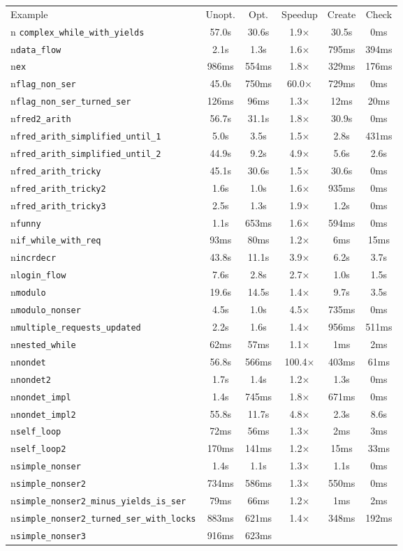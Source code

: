 \begin{tabular}{lccccc}
\toprule
Example & Unopt. & Opt. & Speedup & Create & Check \\n\midrule
\texttt{complex\_while\_with\_yields} & 57.0s & 30.6s & 1.9× & 30.5s & 0ms \\n\texttt{data\_flow} & 2.1s & 1.3s & 1.6× & 795ms & 394ms \\n\texttt{ex} & 986ms & 554ms & 1.8× & 329ms & 176ms \\n\texttt{flag\_non\_ser} & 45.0s & 750ms & 60.0× & 729ms & 0ms \\n\texttt{flag\_non\_ser\_turned\_ser} & 126ms & 96ms & 1.3× & 12ms & 20ms \\n\texttt{fred2\_arith} & 56.7s & 31.1s & 1.8× & 30.9s & 0ms \\n\texttt{fred\_arith\_simplified\_until\_1} & 5.0s & 3.5s & 1.5× & 2.8s & 431ms \\n\texttt{fred\_arith\_simplified\_until\_2} & 44.9s & 9.2s & 4.9× & 5.6s & 2.6s \\n\texttt{fred\_arith\_tricky} & 45.1s & 30.6s & 1.5× & 30.6s & 0ms \\n\texttt{fred\_arith\_tricky2} & 1.6s & 1.0s & 1.6× & 935ms & 0ms \\n\texttt{fred\_arith\_tricky3} & 2.5s & 1.3s & 1.9× & 1.2s & 0ms \\n\texttt{funny} & 1.1s & 653ms & 1.6× & 594ms & 0ms \\n\texttt{if\_while\_with\_req} & 93ms & 80ms & 1.2× & 6ms & 15ms \\n\texttt{incrdecr} & 43.8s & 11.1s & 3.9× & 6.2s & 3.7s \\n\texttt{login\_flow} & 7.6s & 2.8s & 2.7× & 1.0s & 1.5s \\n\texttt{modulo} & 19.6s & 14.5s & 1.4× & 9.7s & 3.5s \\n\texttt{modulo\_nonser} & 4.5s & 1.0s & 4.5× & 735ms & 0ms \\n\texttt{multiple\_requests\_updated} & 2.2s & 1.6s & 1.4× & 956ms & 511ms \\n\texttt{nested\_while} & 62ms & 57ms & 1.1× & 1ms & 2ms \\n\texttt{nondet} & 56.8s & 566ms & 100.4× & 403ms & 61ms \\n\texttt{nondet2} & 1.7s & 1.4s & 1.2× & 1.3s & 0ms \\n\texttt{nondet\_impl} & 1.4s & 745ms & 1.8× & 671ms & 0ms \\n\texttt{nondet\_impl2} & 55.8s & 11.7s & 4.8× & 2.3s & 8.6s \\n\texttt{self\_loop} & 72ms & 56ms & 1.3× & 2ms & 3ms \\n\texttt{self\_loop2} & 170ms & 141ms & 1.2× & 15ms & 33ms \\n\texttt{simple\_nonser} & 1.4s & 1.1s & 1.3× & 1.1s & 0ms \\n\texttt{simple\_nonser2} & 734ms & 586ms & 1.3× & 550ms & 0ms \\n\texttt{simple\_nonser2\_minus\_yields\_is\_ser} & 79ms & 66ms & 1.2× & 1ms & 2ms \\n\texttt{simple\_nonser2\_turned\_ser\_with\_locks} & 883ms & 621ms & 1.4× & 348ms & 192ms \\n\texttt{simple\_nonser3} & 916ms & 623ms 
\end{tabular}
